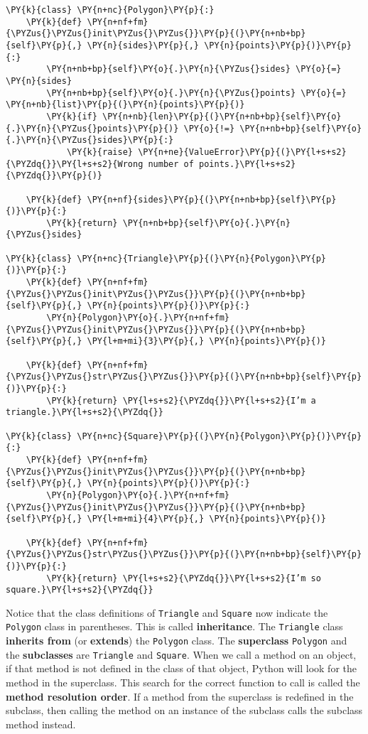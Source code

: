 \begin{Verbatim}[commandchars=\\\{\}]
\PY{k}{class} \PY{n+nc}{Polygon}\PY{p}{:}
    \PY{k}{def} \PY{n+nf+fm}{\PYZus{}\PYZus{}init\PYZus{}\PYZus{}}\PY{p}{(}\PY{n+nb+bp}{self}\PY{p}{,} \PY{n}{sides}\PY{p}{,} \PY{n}{points}\PY{p}{)}\PY{p}{:}
        \PY{n+nb+bp}{self}\PY{o}{.}\PY{n}{\PYZus{}sides} \PY{o}{=} \PY{n}{sides}
        \PY{n+nb+bp}{self}\PY{o}{.}\PY{n}{\PYZus{}points} \PY{o}{=} \PY{n+nb}{list}\PY{p}{(}\PY{n}{points}\PY{p}{)}
        \PY{k}{if} \PY{n+nb}{len}\PY{p}{(}\PY{n+nb+bp}{self}\PY{o}{.}\PY{n}{\PYZus{}points}\PY{p}{)} \PY{o}{!=} \PY{n+nb+bp}{self}\PY{o}{.}\PY{n}{\PYZus{}sides}\PY{p}{:}
            \PY{k}{raise} \PY{n+ne}{ValueError}\PY{p}{(}\PY{l+s+s2}{\PYZdq{}}\PY{l+s+s2}{Wrong number of points.}\PY{l+s+s2}{\PYZdq{}}\PY{p}{)}     

    \PY{k}{def} \PY{n+nf}{sides}\PY{p}{(}\PY{n+nb+bp}{self}\PY{p}{)}\PY{p}{:}
        \PY{k}{return} \PY{n+nb+bp}{self}\PY{o}{.}\PY{n}{\PYZus{}sides}

\PY{k}{class} \PY{n+nc}{Triangle}\PY{p}{(}\PY{n}{Polygon}\PY{p}{)}\PY{p}{:}
    \PY{k}{def} \PY{n+nf+fm}{\PYZus{}\PYZus{}init\PYZus{}\PYZus{}}\PY{p}{(}\PY{n+nb+bp}{self}\PY{p}{,} \PY{n}{points}\PY{p}{)}\PY{p}{:}
        \PY{n}{Polygon}\PY{o}{.}\PY{n+nf+fm}{\PYZus{}\PYZus{}init\PYZus{}\PYZus{}}\PY{p}{(}\PY{n+nb+bp}{self}\PY{p}{,} \PY{l+m+mi}{3}\PY{p}{,} \PY{n}{points}\PY{p}{)}

    \PY{k}{def} \PY{n+nf+fm}{\PYZus{}\PYZus{}str\PYZus{}\PYZus{}}\PY{p}{(}\PY{n+nb+bp}{self}\PY{p}{)}\PY{p}{:}
        \PY{k}{return} \PY{l+s+s2}{\PYZdq{}}\PY{l+s+s2}{I’m a triangle.}\PY{l+s+s2}{\PYZdq{}}

\PY{k}{class} \PY{n+nc}{Square}\PY{p}{(}\PY{n}{Polygon}\PY{p}{)}\PY{p}{:}
    \PY{k}{def} \PY{n+nf+fm}{\PYZus{}\PYZus{}init\PYZus{}\PYZus{}}\PY{p}{(}\PY{n+nb+bp}{self}\PY{p}{,} \PY{n}{points}\PY{p}{)}\PY{p}{:}
        \PY{n}{Polygon}\PY{o}{.}\PY{n+nf+fm}{\PYZus{}\PYZus{}init\PYZus{}\PYZus{}}\PY{p}{(}\PY{n+nb+bp}{self}\PY{p}{,} \PY{l+m+mi}{4}\PY{p}{,} \PY{n}{points}\PY{p}{)}

    \PY{k}{def} \PY{n+nf+fm}{\PYZus{}\PYZus{}str\PYZus{}\PYZus{}}\PY{p}{(}\PY{n+nb+bp}{self}\PY{p}{)}\PY{p}{:}
        \PY{k}{return} \PY{l+s+s2}{\PYZdq{}}\PY{l+s+s2}{I’m so square.}\PY{l+s+s2}{\PYZdq{}}
\end{Verbatim}



Notice that the class definitions of \texttt{Triangle} and \texttt{Square} now indicate the \texttt{Polygon} class in parentheses.  This is called \textbf{inheritance}.  The \texttt{Triangle} class \textbf{inherits from} (or \textbf{extends}) the \texttt{Polygon} class.  The \textbf{superclass} \texttt{Polygon} and the \textbf{subclasses} are \texttt{Triangle} and \texttt{Square}.  When we call a method on an object, if that method is not defined in the class of that object, Python will look for the method in the superclass.   This search for the correct function to call is called the \textbf{method resolution order}.   If a method from the superclass is redefined in the subclass, then calling the method on an instance of the subclass calls the subclass method instead.


